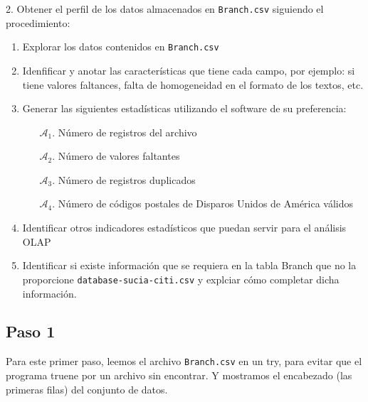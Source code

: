 2. Obtener el perfil de los datos almacenados en \texttt{Branch.csv} 
siguiendo el procedimiento:
\begin{enumerate}
    \item Explorar los datos contenidos en \texttt{Branch.csv}
    
    \item Idenfificar y anotar las características que tiene 
        cada campo, por ejemplo: si tiene valores faltances, 
        falta de homogeneidad en el formato de los textos, etc.
    
    \item Generar las siguientes estadísticas utilizando el 
        software de su preferencia:
        \begin{itemize}
            \item[$\mathcal{A}_1$.] Número de registros del archivo
            \item[$\mathcal{A}_2$.] Número de valores faltantes
            \item[$\mathcal{A}_3$.] Número de registros duplicados
            \item[$\mathcal{A}_4$.] Número de códigos postales de 
                Disparos Unidos de América válidos     
        \end{itemize}
    
    \item Identificar otros indicadores estadísticos que puedan 
        servir para el análisis OLAP
    
    \item Identificar si existe información que se requiera en la 
        tabla Branch que no la proporcione \texttt{database-sucia-citi.csv}
        y explciar cómo completar dicha información. 
\end{enumerate}

\vspace{0.3 cm}

\subsection*{Paso 1}

Para este primer paso, leemos el archivo \texttt{Branch.csv} en un 
try, para evitar que el programa truene por un archivo sin encontrar. 
Y mostramos el encabezado (las primeras filas) del conjunto de datos.

\vspace{0.5 cm}




